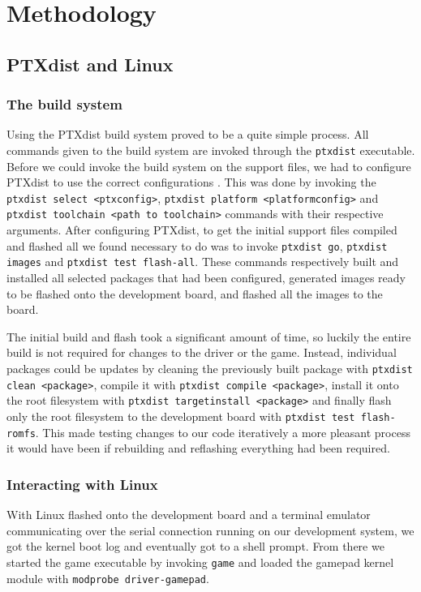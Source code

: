 \chapter{Methodology}

\section{PTXdist and Linux}

\subsection{The build system}

Using the PTXdist build system proved to be a quite simple process. All commands
given to the build system are invoked through the \texttt{ptxdist} executable.
Before we could invoke the build system on the support files, we had to
configure PTXdist to use the correct configurations \cite{TDT4528Compendium}.
This was done by invoking the \texttt{ptxdist select <ptxconfig>},
\texttt{ptxdist platform <platformconfig>} and \texttt{ptxdist toolchain <path
to toolchain>} commands with their respective arguments. After configuring
PTXdist, to get the initial support files compiled and flashed all we found
necessary to do was to invoke \texttt{ptxdist go}, \texttt{ptxdist images} and
\texttt{ptxdist test flash-all}. These commands respectively built and installed
all selected packages that had been configured, generated images ready to be
flashed onto the development board, and flashed all the images to the board.

The initial build and flash took a significant amount of time, so luckily the
entire build is not required for changes to the driver or the game. Instead,
individual packages could be updates by cleaning the previously built package
with \texttt{ptxdist clean <package>}, compile it with \texttt{ptxdist compile
<package>}, install it onto the root filesystem with \texttt{ptxdist
targetinstall <package>} and finally flash only the root filesystem to the
development board with \texttt{ptxdist test flash-romfs}. This made testing
changes to our code iteratively a more pleasant process it would have been if
rebuilding and reflashing everything had been required.

\subsection{Interacting with Linux}

With Linux flashed onto the development board and a terminal emulator
communicating over the serial connection running on our development system, we
got the kernel boot log and eventually got to a shell prompt. From there we
started the game executable by invoking \texttt{game} and loaded the gamepad
kernel module with \texttt{modprobe driver-gamepad}.

